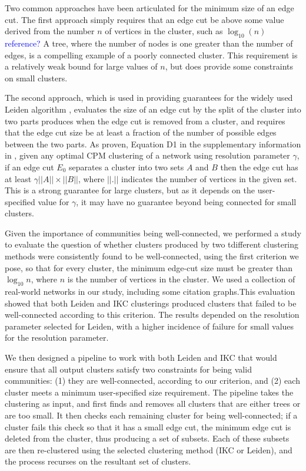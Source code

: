 \documentclass[12pt, oneside]{article}   	%
\begin{document}
Two common approaches have been articulated for the minimum size of an edge cut. The first approach simply requires that an edge cut be above some value derived from the number $n$ of 
vertices in the cluster, such as $\log_{10}(n)$ \textcolor{blue}{reference?} A tree, where the number of nodes is one greater than the number of edges, is  a compelling example of a poorly connected cluster. 
This requirement is a relatively weak bound for large values of $n$, but does provide some constraints on small clusters. 

The second approach, which is used in providing guarantees for the widely used Leiden algorithm \citep{Traag_2019}, evaluates the size of an edge cut by the split  of the cluster into two parts produces 
when the edge cut is removed from a cluster, and requires that the edge cut size be at least a fraction of the number of possible edges between the two  parts.
As proven, Equation D1 in the supplementary information in \cite{Traag_2019}, given any optimal CPM clustering of a network using resolution parameter $\gamma$, if an edge cut $E_0$
separates a cluster into two sets $A$ and $B$ then the edge cut has at least $\gamma ||A|| \times ||B||$, where $||.||$ indicates the number of vertices in the given set.
This is a strong guarantee for large clusters,  but as it depends on the user-specified value for $\gamma$, it may have no guarantee  beyond being connected for small clusters. 


Given the importance of communities being well-connected, we performed a study to evaluate the question of whether clusters produced by two tdifferent clustering methods
were consistently found to be well-connected, using the first criterion we pose, so that for every cluster, the minimum edge-cut size must be greater than $\log_{10}n$, where $n$ is the number of vertices in the cluster. 
We used a collection of real-world networks in our study, including some citation graphs.This evaluation showed that both Leiden and IKC clusterings produced clusters that failed to be well-connected according to this criterion.
The results depended on the resolution parameter selected for Leiden,  with a higher incidence of failure for small values for the resolution parameter.

We then designed a pipeline to work with both Leiden and IKC that would ensure that all output clusters satisfy two constraints for being valid communities: (1) they are well-connected, according to our criterion, and (2) each cluster meets a minimum user-specified size requirement. The pipeline takes the clustering as input, and first finds and removes all clusters that are either trees or are too small.  It then checks each remaining cluster for being well-connected; if a cluster fails this check so that it has a small edge cut, the minimum edge cut is deleted from the cluster, thus producing a set of subsets.  Each of these subsets are then re-clustered using the selected clustering method (IKC or Leiden), and the process recurses on the resultant set of clusters.
\end{document}

